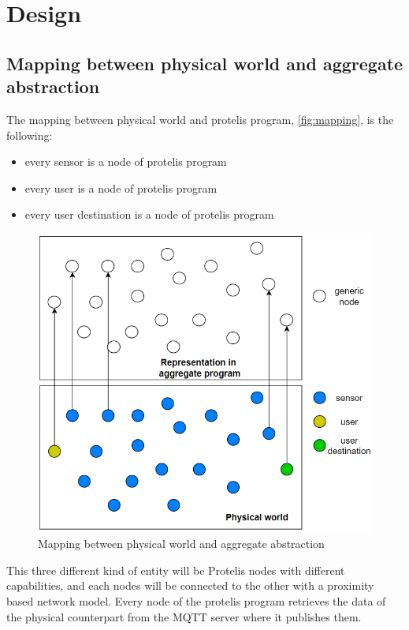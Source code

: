 \chapter{Design}

\section{Mapping between physical world and aggregate abstraction}

The mapping between physical world and protelis program, \autoref{fig:mapping}, is the following:
\begin{itemize}
    \item every sensor is a node of protelis program
    \item every user is a node of protelis program
    \item every user destination is a node of protelis program
\end{itemize}

\begin{figure}[h]
    \centering
    \includegraphics{images/mapping_physicalWorld_ac.png}
    \caption{Mapping between physical world and aggregate abstraction}
    \label{fig:mapping}
\end{figure}
This three different kind of entity will be Protelis nodes with different capabilities, and each nodes will be connected to the other with a proximity based network model. 
Every node of the protelis program retrieves the data of the physical counterpart from the MQTT server where it publishes them.

